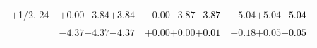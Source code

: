 \documentclass[compress]{beamer}
\begin{document}
\begin{frame}
\begin{tabular}{r | c | c | c}
$+$1/2, 24 & $+0.00$\hspace{0.1 cm}$+3.84$\hspace{0.1 cm}\textcolor{black}{$+3.84$} & $-0.00$\hspace{0.1 cm}$-3.87$\hspace{0.1 cm}\textcolor{black}{$-3.87$} & $+5.04$\hspace{0.1 cm}$+5.04$\hspace{0.1 cm}\textcolor{black}{$+5.04$} \\
           & $-4.37$\hspace{0.1 cm}$-4.37$\hspace{0.1 cm}\textcolor{black}{$-4.37$} & $+0.00$\hspace{0.1 cm}$+0.00$\hspace{0.1 cm}\textcolor{black}{$+0.01$} & $+0.18$\hspace{0.1 cm}$+0.05$\hspace{0.1 cm}\textcolor{black}{$+0.05$} \\
\end{tabular}
\end{frame}
\end{document}
